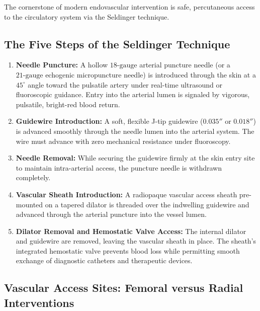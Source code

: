 \documentclass[11pt,a4paper]{article}
\begin{document}
The cornerstone of modern endovascular intervention is safe, percutaneous access to the circulatory system via the Seldinger technique.

\subsection{The Five Steps of the Seldinger Technique}

\begin{enumerate}[leftmargin=*]
    \item \textbf{Needle Puncture:} A hollow $18\text{-gauge}$ arterial puncture needle (or a $21\text{-gauge}$ echogenic micropuncture needle) is introduced through the skin at a $45^\circ$ angle toward the pulsatile artery under real-time ultrasound or fluoroscopic guidance. Entry into the arterial lumen is signaled by vigorous, pulsatile, bright-red blood return.
    \item \textbf{Guidewire Introduction:} A soft, flexible J-tip guidewire ($0.035''$ or $0.018''$) is advanced smoothly through the needle lumen into the arterial system. The wire must advance with zero mechanical resistance under fluoroscopy.
    \item \textbf{Needle Removal:} While securing the guidewire firmly at the skin entry site to maintain intra-arterial access, the puncture needle is withdrawn completely.
    \item \textbf{Vascular Sheath Introduction:} A radiopaque vascular access sheath pre-mounted on a tapered dilator is threaded over the indwelling guidewire and advanced through the arterial puncture into the vessel lumen.
    \item \textbf{Dilator Removal and Hemostatic Valve Access:} The internal dilator and guidewire are removed, leaving the vascular sheath in place. The sheath's integrated hemostatic valve prevents blood loss while permitting smooth exchange of diagnostic catheters and therapeutic devices.
\end{enumerate}

\subsection{Vascular Access Sites: Femoral versus Radial Interventions}
\end{document}
